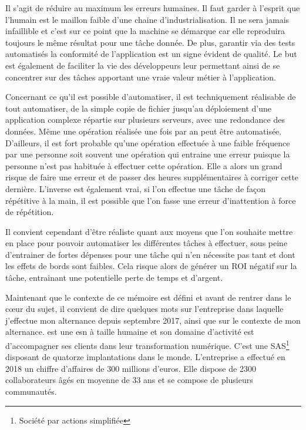 Il s'agit de réduire au maximum les erreurs humaines. Il faut garder à l'esprit que l'humain est le maillon faible d'une chaine d'industrialisation. Il ne sera jamais infaillible et c'est sur ce point que la machine se démarque car elle reproduira toujours le même résultat pour une tâche donnée. De plus, garantir via des tests automatisés la conformité de l'application est un signe évident de qualité. Le but est également de faciliter la vie des développeurs leur permettant ainsi de se concentrer sur des tâches apportant une vraie valeur métier à l'application.

Concernant ce qu'il est possible d'automatiser, il est techniquement réalisable de tout automatiser, de la simple copie de fichier jusqu'au déploiement d'une application complexe répartie sur plusieurs serveurs, avec une redondance des données. Même une opération réalisée une fois par an peut être automatisée. D'ailleurs, il est fort probable qu'une opération effectuée à une faible fréquence par une personne soit souvent une opération qui entraine une erreur puisque la personne n'est pas habituée à effectuer cette opération. Elle a alors un grand risque de faire une erreur et de passer des heures supplémentaires à corriger cette dernière. L'inverse est également vrai, si l'on effectue une tâche de façon répétitive à la main, il est possible que l'on fasse une erreur d'inattention à force de répétition. 

Il convient cependant d'être réaliste quant aux moyens que l'on souhaite mettre en place pour pouvoir automatiser les différentes tâches à effectuer, sous peine d'entrainer de fortes dépenses pour une tâche qui n'en nécessite pas tant et dont les effets de bords sont faibles. Cela risque alors de générer un \gls{ROI} négatif sur la tâche, entrainant une potentielle perte de temps et d'argent.

Maintenant que le contexte de ce mémoire est défini et avant de rentrer dans le cœur du sujet, il convient de dire quelques mots sur l'entreprise dans laquelle j'effectue mon alternance depuis septembre 2017, \onepoint{} ainsi que sur le contexte de mon alternance. \xmakefirstuc{\onepoint{}} est une \gls{esn} à taille humaine et son domaine d'activité est d'accompagner ses clients dans leur transformation numérique. C'est une SAS\footnote{Société par actions simplifiée} disposant de quatorze implantations dans le monde. L'entreprise a effectué en 2018 un chiffre d'affaires de 300 millions d'euros. Elle dispose de 2300 collaborateurs âgés en moyenne de 33 ans et se compose de plusieurs communautés.

